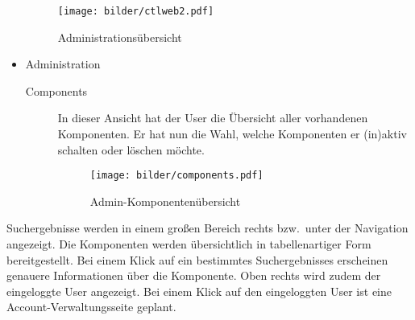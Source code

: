 \begin{itemize}
\begin{description}
      \end{description} 

      
    \begin{figure}      \texttt{[image: bilder/ctlweb2.pdf]}
      \caption{Administrationsübersicht}
      \label{fig:gui}
    \end{figure}


    \item Administration
      \begin{description}
        \item[Components] In dieser Ansicht hat der User die Übersicht aller vorhandenen Komponenten. Er hat nun die Wahl, welche 
        Komponenten er (in)aktiv schalten oder löschen möchte. 

        \begin{figure}[!htp]
          \texttt{[image: bilder/components.pdf]}
          \caption{Admin-Komponentenübersicht}
          \label{fig:gui}
        \end{figure}
             
      \end{description}
 \end{itemize}
 


Suchergebnisse werden in einem großen Bereich rechts bzw.\ unter der Navigation angezeigt. 
Die Komponenten werden übersichtlich in tabellenartiger Form bereitgestellt. Bei einem Klick auf ein bestimmtes Suchergebnisses erscheinen genauere Informationen über die Komponente. 
Oben rechts wird zudem der eingeloggte User angezeigt.
Bei einem Klick auf den eingeloggten User ist eine Account-Verwaltungsseite geplant.
